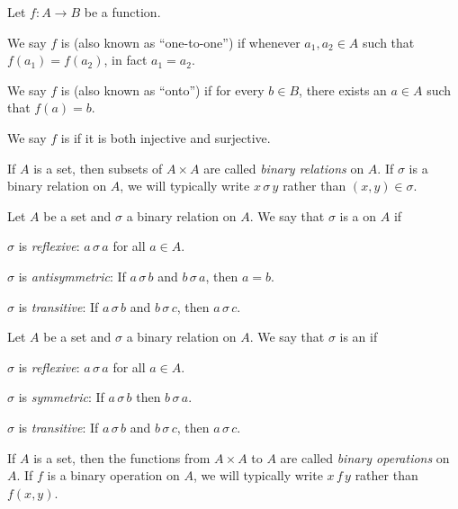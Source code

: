 \begin{proplist}
\item Let \(f : A \rightarrow B\) be a function.
\begin{proplist}
\item We say \(f\) is  (also known as ``one-to-one'') if whenever \(a_1, a_2 \in A\) such that \(f(a_1) = f(a_2)\), in fact \(a_1 = a_2\).
\item We say \(f\) is  (also known as ``onto'') if for every \(b \in B\), there exists an \(a \in A\) such that \(f(a) = b\).
\item We say \(f\) is  if it is both injective and surjective.
\end{proplist}

\item If \(A\) is a set, then subsets of \(A \times A\) are called \emph{binary relations} on \(A\). If \(\sigma\) is a binary relation on \(A\), we will typically write \(x \,\sigma\, y\) rather than \((x,y) \in \sigma\).

\item Let \(A\) be a set and \(\sigma\) a binary relation on \(A\). We say that \(\sigma\) is a  on \(A\) if
\begin{proplist}
\item \(\sigma\) is \emph{reflexive}: \(a \,\sigma\, a\) for all \(a \in A\).
\item \(\sigma\) is \emph{antisymmetric}: If \(a \,\sigma\, b\) and \(b \,\sigma\, a\), then \(a = b\).
\item \(\sigma\) is \emph{transitive}: If \(a \,\sigma\, b\) and \(b \,\sigma\, c\), then \(a \,\sigma\, c\).
\end{proplist}

\item Let \(A\) be a set and \(\sigma\) a binary relation on \(A\). We say that \(\sigma\) is an  if
\begin{proplist}
\item \(\sigma\) is \emph{reflexive}: \(a \,\sigma\, a\) for all \(a \in A\).
\item \(\sigma\) is \emph{symmetric}: If \(a \,\sigma\, b\) then \(b \,\sigma\, a\).
\item \(\sigma\) is \emph{transitive}: If \(a \,\sigma\, b\) and \(b \,\sigma\, c\), then \(a \,\sigma\, c\).
\end{proplist}

\item If \(A\) is a set, then the functions from \(A \times A\) to \(A\) are called \emph{binary operations} on \(A\). If \(f\) is a binary operation on \(A\), we will typically write \(x \,f\, y\) rather than \(f(x,y)\).
\end{proplist}
